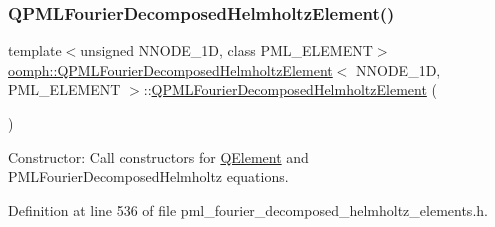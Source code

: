 \subsubsection{\texorpdfstring{Q\+P\+M\+L\+Fourier\+Decomposed\+Helmholtz\+Element()}{QPMLFourierDecomposedHelmholtzElement()}\hspace{0.1cm}{\footnotesize\ttfamily [1/2]}}
{\footnotesize\ttfamily template$<$unsigned N\+N\+O\+D\+E\+\_\+1D, class P\+M\+L\+\_\+\+E\+L\+E\+M\+E\+NT$>$ \\
\hyperlink{classoomph_1_1QPMLFourierDecomposedHelmholtzElement}{oomph\+::\+Q\+P\+M\+L\+Fourier\+Decomposed\+Helmholtz\+Element}$<$ N\+N\+O\+D\+E\+\_\+1D, P\+M\+L\+\_\+\+E\+L\+E\+M\+E\+NT $>$\+::\hyperlink{classoomph_1_1QPMLFourierDecomposedHelmholtzElement}{Q\+P\+M\+L\+Fourier\+Decomposed\+Helmholtz\+Element} (\begin{DoxyParamCaption}{ }\end{DoxyParamCaption})\hspace{0.3cm}{\ttfamily [inline]}}



Constructor\+: Call constructors for \hyperlink{classoomph_1_1QElement}{Q\+Element} and P\+M\+L\+Fourier\+Decomposed\+Helmholtz equations. 



Definition at line 536 of file pml\+\_\+fourier\+\_\+decomposed\+\_\+helmholtz\+\_\+elements.\+h.

\mbox{\label{classoomph_1_1QPMLFourierDecomposedHelmholtzElement_ae8f7a33c18c1d8322f60923d6d59d622}} 
